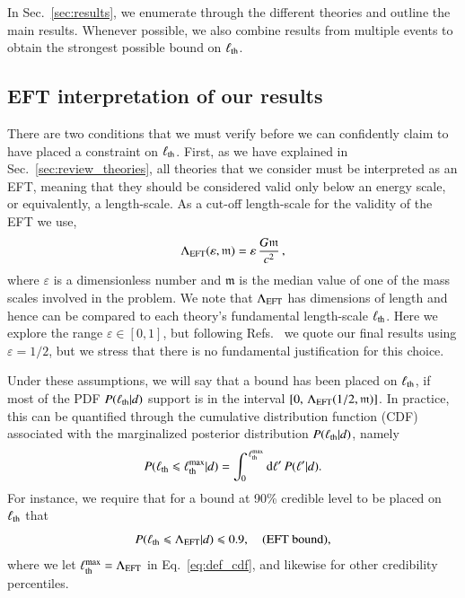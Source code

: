 \documentclass[twocolumn,
               prd,
               aps,
               superscriptaddress,
               tightenlines,
               nofootinbib,
               eqsecnum,
               amsfonts,
               amsmath,
               longbibliography]{revtex4-1}
\newcommand{\dd}{{\rm d}}
\begin{document}
In Sec.~\ref{sec:results}, we enumerate through the different theories and
outline the main results. Whenever possible, we also combine results from
multiple events to obtain the strongest possible bound on $\ell_{\rm th}$.

\subsection{EFT interpretation of our results}
\label{sec:remarks}

There are two conditions that we must verify before we can confidently claim to
have placed a constraint on $\ell_{\rm th}$. First, as we have explained in Sec.~\ref{sec:review_theories}, all theories that we
consider must be interpreted as an EFT, meaning that they should be
considered valid only below an energy scale, or equivalently, a length-scale.
%
As a cut-off length-scale for the validity of the EFT we use,
%
\begin{equation}
\Lambda_{\rm EFT} (\varepsilon, \mathfrak{m}) = \varepsilon \, \frac{G \mathfrak{m}}{c^2} \,,
\label{eq:def_cutoff}
\end{equation}
%
where $\varepsilon$ is a dimensionless number and $\mathfrak{m}$ is the median
value of one of the mass scales involved in the problem.
%
We note that $\Lambda_{\rm EFT}$ has dimensions of length and hence can be compared to each theory's fundamental length-scale $\ell_{\rm th}$.
%
Here we explore the range $\varepsilon \in [0, 1]$, but following
Refs.~\cite{Nair:2019iur,Perkins:2021mhb,Lyu:2022gdr} we quote our final
results using $\varepsilon = 1/2$, but we stress that there is no
fundamental justification for this choice.

Under these assumptions, we will say that a bound has been placed on $\ell_{\rm th}$, if most of the PDF $P(\ell_{\rm th} | d)$ support is in the interval
$[0, \, \Lambda_{\rm EFT}(1/2, \mathfrak{m})]$.
%
In practice, this can be quantified through the cumulative distribution function
(CDF) associated with the marginalized posterior distribution $P(\ell_{\rm th} | d)$, namely
%
\begin{equation}
P(\ell_{\rm th} \leqslant \ell^{\rm max}_{\rm th} | d) = \int_{0}^{\,\ell^{\rm max}_{\rm th}} \dd \ell'\, P(\ell' | d).
\label{eq:def_cdf}
\end{equation}
%
For instance, we require that for a bound at 90\% credible level to be placed on $\ell_{\rm th}$ that
%
\begin{equation}
P(\ell_{\rm th} \leqslant \Lambda_{\rm EFT} | d) \leqslant 0.9,
\quad \textrm{(EFT bound)},
\label{eq:eft_bound}
\end{equation}
%
where we let $\ell^{\rm max}_{\rm th} = \Lambda_{\rm EFT}$ in Eq.~\eqref{eq:def_cdf}, and
likewise for other credibility percentiles.
\end{document}
